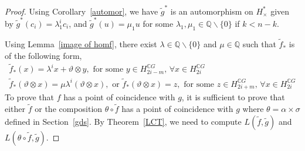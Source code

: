 \documentclass{amsart}
\newcommand{\thmref}[1]{Theorem~\ref{#1}}
\newcommand{\secref}[1]{Section~\ref{#1}}
\newcommand{\lemref}[1]{Lemma~\ref{#1}}
\newcommand{\corref}[1]{Corollary~\ref{#1}}
\begin{document}
\begin{proof}
	Using %
\corref{automor}, we have $\tilde g^*$ is an automorphism on $H^*_{\times}$ given by
	$\tilde g^*(c_i) = \lambda_1^i c_i$, and $\tilde g^*(u) = \mu_1 u$ for some $\lambda_1, \mu_1 \in \mathbb{Q}\backslash \{0\}$ if $k<n-k$.
	
	Using \lemref{image of homf}, there exist $\lambda \in \mathbb{Q}\backslash \{0\}$ and $\mu \in \mathbb{Q}$ such that $\tilde{f}_*$ is of the following %
form, 
	\begin{equation}\label{flower star}
		\begin{split}
			\tilde f_*(x)=\lambda^ix+\vartheta\otimes y, \text{ for some }y\in H_{2i-m}^{\mathbb CG}, \, \forall x \in H_{2i}^{\mathbb{C}G}\\
			\tilde f_*(\vartheta\otimes x)=\mu\lambda^i (\vartheta\otimes x) , \text{ or } \tilde{f}_*(\vartheta \otimes x) = z, \text{ for some }z\in H_{2i+m}^{\mathbb CG},\, \forall x \in H_{2i}^{\mathbb{C}G}
		\end{split}
	\end{equation}
	To %
prove that $f$ has a point of coincidence with $g$, it is sufficient to prove that either $\tilde{f}$ or the composition $\theta \circ \tilde{f} $ has a point of coincidence with $g$ where $\theta = \alpha \times \sigma$ defined in \secref{gds}. By \thmref{LCT}, we need to compute $L(\tilde f, \tilde g)$ and $L(\theta \circ \tilde f, \tilde g)$.
	

\end{proof}
\end{document}
